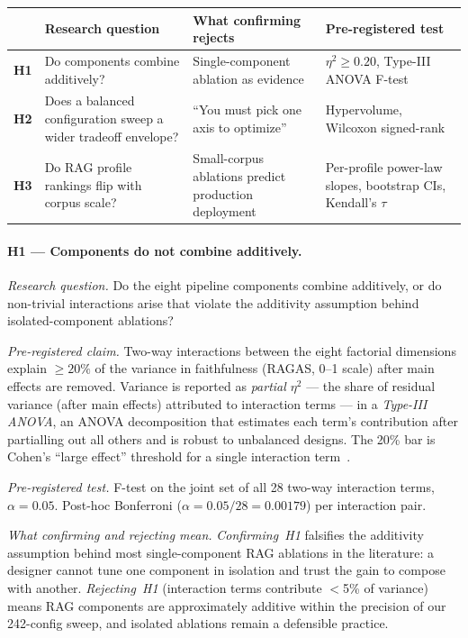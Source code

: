 \begin{table}[h]
\centering
\footnotesize
\begin{tabular}{@{}p{0.8cm}p{4.4cm}p{4.4cm}p{4.0cm}@{}}
\toprule
& Research question & What confirming rejects & Pre-registered test \\
\midrule
\textbf{H1} & Do components combine additively? & Single-component ablation as evidence & $\eta^2 \geq 0.20$, Type-III ANOVA F-test \\
\addlinespace
\textbf{H2} & Does a balanced configuration sweep a wider tradeoff envelope? & ``You must pick one axis to optimize'' & Hypervolume, Wilcoxon signed-rank \\
\addlinespace
\textbf{H3} & Do RAG profile rankings flip with corpus scale? & Small-corpus ablations predict production deployment & Per-profile power-law slopes, bootstrap CIs, Kendall's $\tau$ \\
\bottomrule
\end{tabular}
\end{table}

\paragraph{H1 --- Components do not combine additively.}

\textit{Research question.} Do the eight pipeline components combine
additively, or do non-trivial interactions arise that violate the
additivity assumption behind isolated-component ablations?

\textit{Pre-registered claim.} Two-way interactions between the eight
factorial dimensions explain $\geq 20\%$ of the variance in
faithfulness (RAGAS, 0--1 scale) after main effects are removed.
Variance is reported as \emph{partial $\eta^2$} --- the share of
residual variance (after main effects) attributed to interaction
terms --- in a \emph{Type-III ANOVA}, an ANOVA decomposition that
estimates each term's contribution after partialling out all others
and is robust to unbalanced designs.  The 20\% bar is Cohen's ``large
effect'' threshold for a single interaction
term~\citep{cohen1988statistical}.

\textit{Pre-registered test.} F-test on the joint set of all 28
two-way interaction terms, $\alpha = 0.05$.  Post-hoc Bonferroni
($\alpha = 0.05 / 28 = 0.00179$) per interaction pair.

\textit{What confirming and rejecting mean.} \emph{Confirming~H1}
falsifies the additivity assumption behind most single-component RAG
ablations in the literature: a designer cannot tune one component in
isolation and trust the gain to compose with another.
\emph{Rejecting~H1} (interaction terms contribute $<$5\% of variance)
means RAG components are approximately additive within the precision
of our 242-config sweep, and isolated ablations remain a defensible
practice.

